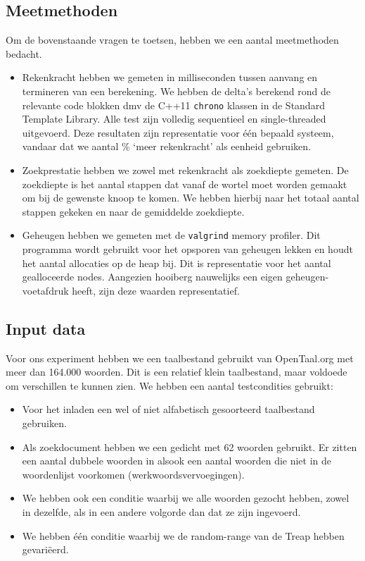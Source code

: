\documentclass[a4paper,10pt]{article}
\begin{document}
\subsection{Meetmethoden}

Om de bovenstaande vragen te toetsen, hebben we een aantal meetmethoden bedacht.

\begin{itemize}
\item Rekenkracht hebben we gemeten in milliseconden tussen aanvang en termineren van een berekening. We hebben de delta's berekend rond de relevante code blokken dmv de C++11 \texttt{chrono} klassen in de Standard Template Library. Alle test zijn volledig sequentieel en single-threaded uitgevoerd. Deze resultaten zijn representatie voor \'e\'en bepaald systeem, vandaar dat we aantal \% `meer rekenkracht' als eenheid gebruiken.
\item Zoekprestatie hebben we zowel met rekenkracht als zoekdiepte gemeten. De zoekdiepte is het aantal stappen dat vanaf de wortel moet worden gemaakt om bij de gewenste knoop te komen. We hebben hierbij naar het totaal aantal stappen gekeken en naar de gemiddelde zoekdiepte.
\item Geheugen hebben we gemeten met de \texttt{valgrind} memory profiler. Dit programma wordt gebruikt voor het opsporen van geheugen lekken en houdt het aantal allocaties op de heap bij. Dit is representatie voor het aantal gealloceerde nodes. Aangezien hooiberg nauwelijks een eigen geheugen-voetafdruk heeft, zijn deze waarden representatief.
\end{itemize}

\subsection{Input data}

Voor ons experiment hebben we een taalbestand gebruikt van OpenTaal.org met meer dan 164.000 woorden. Dit is een relatief klein taalbestand, maar voldoede om verschillen te kunnen zien. We hebben een aantal testcondities gebruikt:
\begin{itemize}
\item Voor het inladen een wel of niet alfabetisch gesoorteerd taalbestand gebruiken.
\item Als zoekdocument hebben we een gedicht met 62 woorden gebruikt. Er zitten een aantal dubbele woorden in alsook een aantal woorden die niet in de woordenlijst voorkomen (werkwoordsvervoegingen).
\item We hebben ook een conditie waarbij we alle woorden gezocht hebben, zowel in dezelfde, als in een andere volgorde dan dat ze zijn ingevoerd.
\item We hebben \'e\'en conditie waarbij we de random-range van de Treap hebben gevari\"eerd.
\end{itemize}
\end{document}

